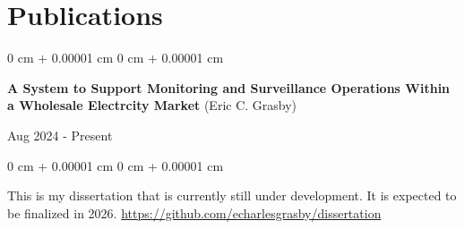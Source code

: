 \documentclass[10pt, letterpaper]{article}
\newenvironment{onecolentry}{
    \begin{adjustwidth}{
        0 cm + 0.00001 cm
    }{
        0 cm + 0.00001 cm
    }
}{
    \end{adjustwidth}
} %
\newenvironment{twocolentry}[2][]{
    \onecolentry
    \def\secondColumn{#2}
    \setcolumnwidth{\fill, 4.5 cm}
    \begin{paracol}{2}
}{
    \switchcolumn \raggedleft \secondColumn
    \end{paracol}
    \endonecolentry
} %
\begin{document}
    \section{Publications}
        \begin{samepage}
            \begin{twocolentry}{
                Aug 2024 - Present
            }
                \textbf{A System to Support Monitoring and Surveillance Operations Within a Wholesale Electrcity Market} (Eric C. Grasby)
            \end{twocolentry}
%
            \vspace{0.10 cm}
            
        \begin{onecolentry}

                \vspace{0.10 cm}
                
         This is my dissertation that is currently still under development. It is expected to be finalized in 2026.
         \newline
         \url{https://github.com/echarlesgrasby/dissertation}
        \end{onecolentry}
        \end{samepage}


    \vspace{0.2 cm}
    
\end{document}
